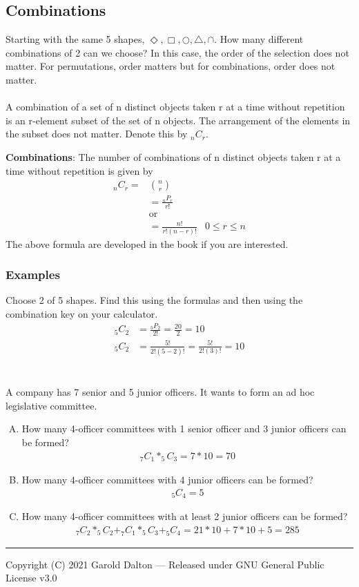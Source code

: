 \documentclass[14pt]{extarticle}
\begin{document}
\subsection{Combinations}
Starting with the same 5 shapes, $\Diamond, \Box, \bigcirc, \bigtriangleup, \cap$. How many different combinations of 2 can we choose? In this case, the order of the selection does not matter. For permutations, order matters but for combinations, order does not matter.
\\\\
A combination of a set of n distinct objects taken r at a time without repetition is an r-element subset of the set of n objects. The arrangement of the elements in the subset does not matter. Denote this by $_{n}C_r$.

\begin{tcolorbox}[enhanced jigsaw,colback=bg,boxrule=0pt,arc=0pt] 
	\textbf{Combinations}:  The number of combinations of n distinct objects taken r at a time without repetition is given by
	\begin{align*}
		_nC_r =&n\choose r\\
		&= \frac{_nP_r}{r!}\\
		&\text{or} \\
		&= \frac{n!}{r!(n-r)!} &0 \leq r \leq n
	\end{align*}
The above formula are developed in the book if you are interested.
\end{tcolorbox}

\subsubsection{Examples}
Choose 2 of 5 shapes. Find this using the formulas and then using the combination key on your calculator.
\begin{align*}
	_{5}C_2 &= \frac{_5P_2}{2!} = \frac{20}{2} = 10 \\
	_{5}C_2 &= \frac{5!}{2!(5-2)!} = \frac{5!}{2!(3)!} = 10
\end{align*}
\\\\
A company has 7 senior and 5 junior officers. It wants to form an ad hoc legislative committee.
\begin{enumerate}[A)]
	\item How many 4-officer committees with 1 senior officer and 3 junior officers can be formed?
	\begin{align*}
		_{7}C_1 * _{5}C_3 = 7*10=70
	\end{align*}
	\item How many 4-officer committees with 4 junior officers can be formed?
	\begin{align*}
		_{5}C_4 = 5
	\end{align*}
	\item How many 4-officer committees with at least 2 junior officers can be formed?
	\begin{align*}
		_{7}C_2 * _{5}C_2 +_{7}C_1*_{5}C_3 + _{5}C_4 = 21*10+7*10+5=285
	\end{align*}
\end{enumerate}



\noindent\rule{\textwidth}{1pt}
{\footnotesize Copyright (C) 2021 Garold Dalton --- Released under GNU General Public License v3.0}


\cleardoublepage
\end{document}
